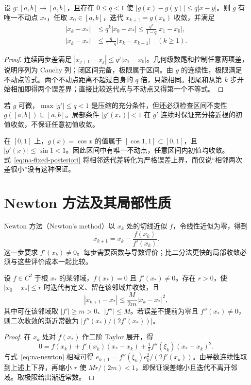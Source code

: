 \begin{theorem}[区间上的压缩映射]
\label{thm:na-contraction}
设 $g:[a,b]\to[a,b]$，且存在 $0\le q<1$ 使 $|g(x)-g(y)|\le q|x-y|$。则 $g$ 有唯一不动点 $x_*$，任取 $x_0\in[a,b]$，迭代 $x_{k+1}=g(x_k)$ 收敛，并满足
\begin{align}
 |x_k-x_*|&\le q^k|x_0-x_*|\le\frac{q^k}{1-q}|x_1-x_0|,\label{eq:na-fixed-priori}\\
 |x_k-x_*|&\le\frac{q}{1-q}|x_k-x_{k-1}|\quad(k\ge1).\label{eq:na-fixed-posteriori}
\end{align}
\end{theorem}
\begin{proof}
连续两步差满足 $|x_{j+1}-x_j|\le q^j|x_1-x_0|$。几何级数尾和控制任意两项差，说明序列为 Cauchy 列；闭区间完备，极限属于区间。由 $g$ 的连续性，极限满足不动点等式。两个不动点距离不超过自身的 $q$ 倍，只能相同。把尾和从第 $k$ 步开始相加即得两个误差界；直接比较迭代点与不动点又得第一个不等式。
\end{proof}

若 $g$ 可微，$\max|g'|\le q<1$ 是压缩的充分条件，但还必须检查区间不变性 $g([a,b])\subseteq[a,b]$。局部条件 $|g'(x_*)|<1$ 在 $g'$ 连续时保证充分接近根的初值收敛，不保证任意初值收敛。

\begin{example}[求解 $x=\cos x$]
在 $[0,1]$ 上，$g(x)=\cos x$ 的值属于 $[\cos1,1]\subset[0,1]$，且 $|g'(x)|\le\sin1<1$。因此区间中有唯一不动点，任意区间内初值均收敛。式~\eqref{eq:na-fixed-posteriori} 将相邻迭代差转化为严格误差上界，而仅说“相邻两次差很小”没有这种保证。
\end{example}

\section{Newton 方法及其局部性质}
Newton 方法（Newton's method）以 $x_k$ 处的切线近似 $f$，令线性近似为零，得到
\begin{equation}
 x_{k+1}=x_k-\frac{f(x_k)}{f'(x_k)}.
 \label{eq:na-newton}
\end{equation}
这一步要求 $f'(x_k)\ne0$。每步需要函数与导数评价；比二分法更快的局部收敛必须与这些评价成本一起比较。

\begin{theorem}
\label{thm:na-newton}
设 $f\in C^2$ 于根 $x_*$ 的某邻域，$f(x_*)=0$ 且 $f'(x_*)\ne0$。存在 $r>0$，使 $|x_0-x_*|\le r$ 时迭代有定义、留在该邻域并收敛，且
\[
 |x_{k+1}-x_*|\le \frac{M}{2m}|x_k-x_*|^2,
\]
其中可在该邻域取 $|f'|\ge m>0$、$|f''|\le M$。若误差不提前为零且 $f''(x_*)\ne0$，则二次收敛的渐近常数为 $|f''(x_*)/(2f'(x_*))|$。
\end{theorem}
\begin{proof}
在 $x_k$ 处对 $f(x_*)$ 作二阶 Taylor 展开，得
\[
 0=f(x_k)+f'(x_k)(x_*-x_k)+\tfrac12 f''(\xi_k)(x_*-x_k)^2.
\]
与式~\eqref{eq:na-newton} 相减可得 $e_{k+1}=f''(\xi_k)e_k^2/(2f'(x_k))$。由导数连续性取到上述上下界，再缩小 $r$ 使 $Mr/(2m)<1$，即保证误差缩小且迭代不离开邻域。取极限给出渐近常数。
\end{proof}

